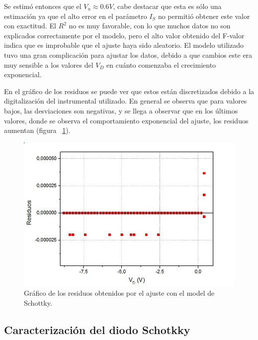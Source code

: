 \documentclass[twoside,twocolumn,a4paper]{article}
\begin{document}
Se estim\'o entonces que el $V_u\approx0.6V$, cabe destacar que esta es s\'olo una estimaci\'on ya que el alto error en el par\'ametro $I_S$ no permiti\'o obtener este valor con exactitud. El $R^2$ no es muy favorable, con lo que muchos datos no son explicados correctamente por el modelo, pero el alto valor obtenido del F-valor indica que es improbable que el ajuste haya sido aleatorio. El modelo utilizado tuvo una gran complicaci\'on para ajustar los datos, debido a que cambios este era muy sensible a los valores del $V_D$ en cu\'anto comenzaba el crecimiento exponencial. \par 
En el gr\'afico de los residuos se puede ver que estos est\'an discretizados debido a la digitalizaci\'on del instrumental utilizado. En general se observa que para valores bajos, las desviaciones son negativas, y se llega a observar que en los \'ultimos valores, donde se observa el comportamiento exponencial del ajuste, los residuos aumentan (figura ~\ref{fig:res}).

\begin{figure}[h]
\includegraphics[width=\linewidth]{residuos.jpg}
\captionsetup{justification=centering}
\caption{Gr\'afico de los residuos obtenidos por el ajuste con el model de Schottky.}
\label{fig:res}
\end{figure} 


\subsection{Caracterizaci\'on del diodo Schotkky}
\end{document}
